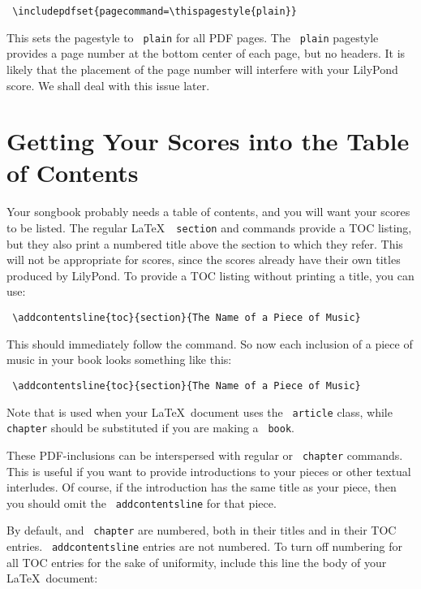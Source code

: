 \documentclass[../../LilyPond-Tutorials]{subfiles}
\begin{document}
\begin{verbatim} \includepdfset{pagecommand=\thispagestyle{plain}} \end{verbatim}

This sets the pagestyle to \texttt{ plain} for all PDF pages. The \texttt{ plain} pagestyle provides a page number at the bottom center of each page, but no headers. It is likely that the placement of the page number will interfere with your LilyPond score. We shall deal with this issue later.

\section*{Getting Your Scores into the Table of Contents}

Your songbook probably needs a table of contents, and you will want your scores to be listed. The regular \LaTeX\ \cmd\texttt{  section} and  commands provide a TOC listing, but they also print a numbered title above the section to which they refer. This will not be appropriate for scores, since the scores already have their own titles produced by LilyPond. To provide a TOC listing without printing a title, you can use: 

\begin{verbatim} \addcontentsline{toc}{section}{The Name of a Piece of Music} \end{verbatim}

This should immediately follow the  command. So now each inclusion of a piece of music in your book looks something like this:

\begin{verbatim} \addcontentsline{toc}{section}{The Name of a Piece of Music}
  \end{verbatim}

Note that  is used when your \LaTeX\ document uses the \texttt{ article} class, while \texttt{ chapter} should be substituted if you are making a \texttt{ book}.

These PDF-inclusions can be interspersed with regular  or \texttt{ chapter} commands. This is useful if you want to provide introductions to your pieces or other textual interludes. Of course, if the introduction has the same title as your piece, then you should omit the \texttt{ addcontentsline} for that piece.

By default,  and \texttt{ chapter} are numbered, both in their titles and in their TOC entries. \texttt{ addcontentsline} entries are not numbered. To turn off numbering for all TOC entries for the sake of uniformity, include this line the body of your \LaTeX\ document:
\end{document}
